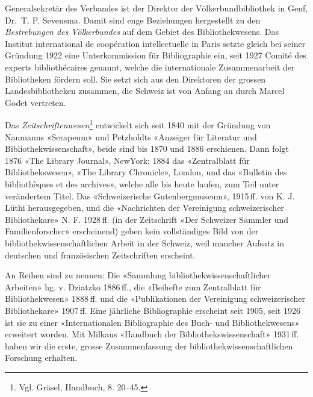 \documentclass[a4paper,
fontsize=11pt,
oneside,
numbers=noperiodatend,
parskip=half-,
bibliography=totoc,
final
]{scrartcl}
\begin{document}
Generalsekretär des Verbandes ist der Direktor der Völkerbundbibliothek
in Genf, Dr.~T. P. Sevensma. Damit sind enge Beziehungen hergestellt zu
den \emph{Bestrebungen des Völkerbundes} auf dem Gebiet des
Bibliothekwesens. Das Institut international de coopération
intellectuelle in Paris setzte gleich bei seiner Gründung 1922 eine
Unterkommission für Bibliographie ein, seit 1927 Comité des experts
bibliothécaires genannt, welche die internationale Zusammenarbeit der
Bibliotheken fördern soll. Sie setzt sich aus den Direktoren der grossen
Landesbibliotheken zusammen, die Schweiz ist von Anfang an durch Marcel
Godet vertreten.

Das \emph{Zeitschriftenwesen}\footnote{Vgl. Gräsel, Handbuch, 8. 20--45.}
entwickelt sich seit 1840 mit der Gründung von Naumanns «Serapeum» und
Petzholdts «Anzeiger für Literatur und Bibliothekwissenschaft», beide
sind bis 1870 und 1886 erschienen. Dann folgt 1876 «The Library
Journal», NewYork; 1884 das «Zentralblatt für Bibliothekswesen», «The
Library Chronicle», London, und das «Bulletin des bibliothèques et des
archives», welche alle bis heute laufen, zum Teil unter verändertem
Titel. Das «Schweizerische Gutenbergmuseum», 1915\,ff. von K. J. Lüthi
herausgegeben, und die «Nachrichten der Vereinigung schweizerischer
Bibliothekare» N. F. 1928\,ff. (in der Zeitschrift «Der Schweizer Sammler
und Familienforscher» erscheinend) geben kein vollständiges Bild von der
bibliothekwissenschaftlichen Arbeit in der Schweiz, weil mancher Aufsatz
in deutschen und französischen Zeitschriften erscheint.

An Reihen sind zu nennen: Die «Sammlung bibliothekwissenschaftlicher
Arbeiten» hg. v. Dziatzko 1886\,ff., die «Beihefte zum Zentralblatt für
Bibliothekwesen» 1888\,ff. und die «Publikationen der Vereinigung
schweizerischer Bibliothekare» 1907\,ff. Eine jährliche Bibliographie
erscheint seit 1905, seit 1926 ist sie zu einer «Internationalen
Bibliographie des Buch- und Bibliothekwesens» erweitert worden. Mit
Milkaus «Handbuch der Bibliothekswissenschaft» 1931\,ff. haben wir die
erste, grosse Zusammenfassung der bibliothekwissenschaftlichen Forschung
erhalten.
\end{document}
